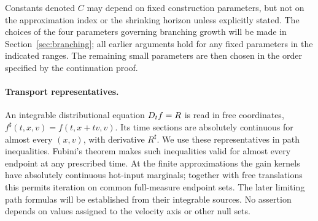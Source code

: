 Constants denoted \(C\) may depend on fixed construction parameters,
but not on the approximation index or the shrinking horizon unless
explicitly stated. The choices of the four parameters governing
branching growth will be made in Section~\ref{sec:branching}; all earlier
arguments hold for any fixed parameters in the indicated ranges. The
remaining small parameters are then chosen in the order specified by
the continuation proof.

\paragraph{Transport representatives.}
An integrable distributional equation \(D_t f=R\) is read in free
coordinates, \(f^\sharp(t,x,v)=f(t,x+tv,v)\). Its time sections are
absolutely continuous for almost every \((x,v)\), with derivative
\(R^\sharp\). We use these representatives in path inequalities.
Fubini's theorem makes such inequalities valid for almost every
endpoint at any prescribed time. At the finite approximations the
gain kernels have absolutely continuous hot-input marginals; together
with free translations this permits iteration on common full-measure
endpoint sets. The later limiting path formulas will be established
from their integrable sources. No assertion depends on values assigned
to the velocity axis or other null sets.
